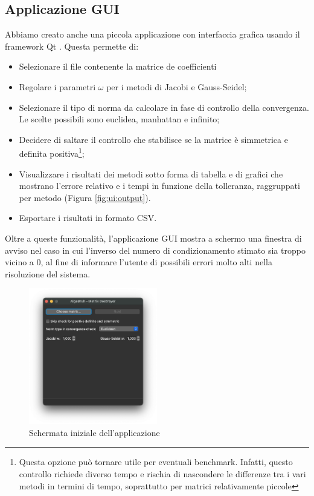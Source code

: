 \subsection{Applicazione GUI}
Abbiamo creato anche una piccola applicazione con interfaccia grafica usando il framework Qt \cite{Qt}. Questa permette di:
\begin{itemize}
	\item Selezionare il file contenente la matrice de coefficienti
	\item Regolare i parametri $\omega$ per i metodi di Jacobi e Gauss-Seidel;
	\item Selezionare il tipo di norma da calcolare in fase di controllo della convergenza. Le scelte possibili sono euclidea, manhattan e infinito;
	\item Decidere di saltare il controllo che stabilisce se la matrice è simmetrica e definita positiva\footnote{Questa opzione può tornare utile per eventuali benchmark. Infatti, questo controllo richiede diverso tempo e rischia di nascondere le differenze tra i vari metodi in termini di tempo, soprattutto per matrici relativamente piccole};
	\item Visualizzare i risultati dei metodi sotto forma di tabella e di grafici che mostrano l'errore relativo e i tempi in funzione della tolleranza, raggruppati per metodo (Figura \ref{fig:ui:output}).
	\item Esportare i risultati in formato CSV.
\end{itemize}

Oltre a queste funzionalità, l'applicazione GUI mostra a schermo una finestra di avviso nel caso in cui l'inverso del  numero di condizionamento stimato sia troppo vicino a 0, al fine di informare l'utente di possibili errori molto alti nella risoluzione del sistema.

\begin{figure}%
	\centering
	\includegraphics[width=0.5\textwidth]{figures/UI/main.png}
	\caption{Schermata iniziale dell'applicazione}%
	\label{fig:ui:main}%
\end{figure}

